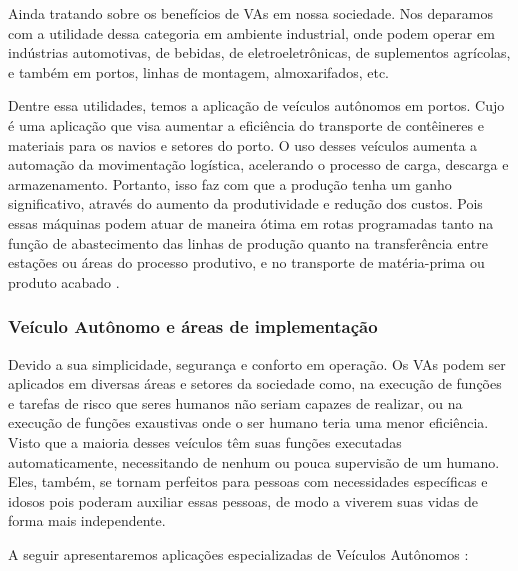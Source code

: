
Ainda tratando sobre os benefícios de VAs em nossa sociedade. Nos deparamos com a utilidade dessa categoria em ambiente industrial, onde podem operar em indústrias automotivas, de bebidas, de eletroeletrônicas, de suplementos agrícolas, e também em portos, linhas de montagem, almoxarifados, etc.

Dentre essa utilidades, temos a aplicação de veículos autônomos em portos. Cujo é uma aplicação que visa aumentar a eficiência do transporte de contêineres e materiais para os navios e setores do porto. O uso desses veículos aumenta a automação da movimentação logística, acelerando o processo de carga, descarga e armazenamento.
Portanto, isso faz com que a produção tenha um ganho significativo, através do aumento da produtividade e redução dos custos. Pois essas máquinas podem atuar de maneira ótima em rotas programadas tanto na função de abastecimento das linhas de produção quanto na transferência entre estações ou áreas do processo produtivo, e no transporte de matéria-prima ou produto acabado \cite{aplicacao}.

\subsubsection{Veículo Autônomo e áreas de implementação} \label{implementacao}

Devido a sua simplicidade, segurança e conforto em operação. Os VAs podem ser aplicados em diversas áreas e setores da sociedade como, na execução de funções e tarefas de risco que seres humanos não seriam capazes de realizar, ou na execução de funções exaustivas onde o ser humano teria uma menor eficiência. Visto que a maioria desses veículos têm suas funções executadas automaticamente, necessitando de nenhum ou pouca supervisão de um humano. Eles, também, se tornam perfeitos para pessoas com necessidades específicas e idosos pois poderam auxiliar essas pessoas, de modo a viverem suas vidas de forma mais independente. 
\vspace {1cm}

A seguir apresentaremos aplicações especializadas de Veículos Autônomos \cite{aplicacao2}:

